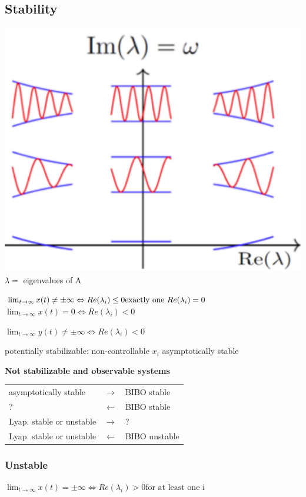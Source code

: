 \subsection{Stability}
    \begin{minipage}{0.39\linewidth}
        \includegraphics[width = \linewidth]{src/images/eigenvalue_response.png}
        $\lambda =$ eigenvalues of A
    \end{minipage}
    \begin{minipage}{0.59\linewidth}
        $\lim_{t \rightarrow \infty} x(t) \neq \pm \infty \Leftrightarrow Re(\lambda_i) \leq 0\\
        \text{exactly one } Re(\lambda_i) = 0$
%
        $\lim_{t \rightarrow \infty} x(t) = 0 \Leftrightarrow Re(\lambda_i) < 0$

        $\lim_{t \rightarrow \infty} y(t) \neq \pm \infty \Leftrightarrow Re(\lambda_i) < 0$
    \end{minipage}
    potentially stabilizable: non-controllable $x_i$ asymptotically stable

    \begin{center}
        \textbf{Not stabilizable and observable systems}
    \end{center}
    \begin{tabu}{|X[6] X X[3]|}
        \hline
        asymptotically stable & $\rightarrow$ & BIBO stable\\
        ? & $\leftarrow$ & BIBO stable\\
        Lyap. stable or unstable & $\rightarrow$ & ?\\
        Lyap. stable or unstable & $\leftarrow$ & BIBO unstable\\
        \hline
    \end{tabu}

    \subsubsection{Unstable}
    $\lim_{t \rightarrow \infty} x(t) = \pm \infty \Leftrightarrow Re(\lambda_i) > 0 \text{for at least one i}$